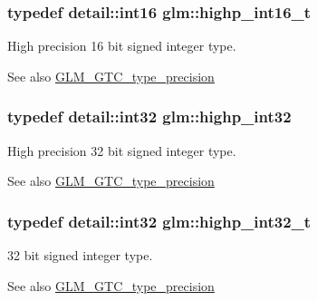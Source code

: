 \subsubsection[{\texorpdfstring{highp\+\_\+int16\+\_\+t}{highp_int16_t}}]{\setlength{\rightskip}{0pt plus 5cm}typedef detail\+::int16 {\bf glm\+::highp\+\_\+int16\+\_\+t}}\hypertarget{group__gtc__type__precision_ga07d318d61472e75238e53b9642227672}{}\label{group__gtc__type__precision_ga07d318d61472e75238e53b9642227672}
High precision 16 bit signed integer type. \begin{DoxySeeAlso}{See also}
\hyperlink{group__gtc__type__precision}{G\+L\+M\+\_\+\+G\+T\+C\+\_\+type\+\_\+precision} 
\end{DoxySeeAlso}
\subsubsection[{\texorpdfstring{highp\+\_\+int32}{highp_int32}}]{\setlength{\rightskip}{0pt plus 5cm}typedef detail\+::int32 {\bf glm\+::highp\+\_\+int32}}\hypertarget{group__gtc__type__precision_gaa2045c92b9553d463191af6a20e997bb}{}\label{group__gtc__type__precision_gaa2045c92b9553d463191af6a20e997bb}
High precision 32 bit signed integer type. \begin{DoxySeeAlso}{See also}
\hyperlink{group__gtc__type__precision}{G\+L\+M\+\_\+\+G\+T\+C\+\_\+type\+\_\+precision} 
\end{DoxySeeAlso}
\subsubsection[{\texorpdfstring{highp\+\_\+int32\+\_\+t}{highp_int32_t}}]{\setlength{\rightskip}{0pt plus 5cm}typedef detail\+::int32 {\bf glm\+::highp\+\_\+int32\+\_\+t}}\hypertarget{group__gtc__type__precision_ga783d077a513c1f475f6cdb406b4238c3}{}\label{group__gtc__type__precision_ga783d077a513c1f475f6cdb406b4238c3}
32 bit signed integer type. \begin{DoxySeeAlso}{See also}
\hyperlink{group__gtc__type__precision}{G\+L\+M\+\_\+\+G\+T\+C\+\_\+type\+\_\+precision} 
\end{DoxySeeAlso}
